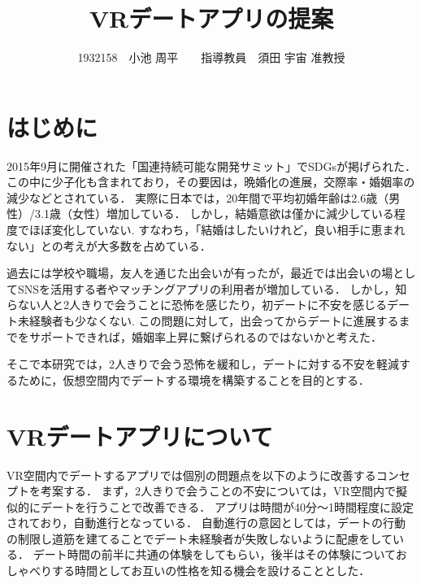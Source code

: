 \documentclass[twocolumn,10pt,a4j]{ltjsarticle}
\title{VRデートアプリの提案}
\author{1932158　小池 周平　　指導教員　須田 宇宙 准教授}
\date{ }
\begin{document}
\maketitle

\section{はじめに}


2015年9月に開催された「国連持続可能な開発サミット」でSDGsが掲げられた．この中に少子化も含まれており，その要因は，晩婚化の進展，交際率・婚姻率の減少\cite{naikakufu2019}などとされている．
実際に日本では，20年間で平均初婚年齢は2.6歳（男性）/3.1歳（女性）増加している．
しかし，結婚意欲は僅かに減少している程度でほぼ変化していない.
すなわち，「結婚はしたいけれど，良い相手に恵まれない」との考えが大多数を占めている\cite{naikakufu2019}．

過去には学校や職場，友人を通じた出会いが有ったが，最近では出会いの場としてSNSを活用する者やマッチングアプリの利用者が増加している．
しかし，知らない人と2人きりで会うことに恐怖を感じたり，初デートに不安を感じるデート未経験者も少なくない\cite{prtimes,yoshimura2020}.
この問題に対して，出会ってからデートに進展するまでをサポートできれば，婚姻率上昇に繋げられるのではないかと考えた．

そこで本研究では，2人きりで会う恐怖を緩和し，デートに対する不安を軽減するために，仮想空間内でデートする環境を構築することを目的とする．





\section{VRデートアプリについて}
VR空間内でデートするアプリでは個別の問題点を以下のように改善するコンセプトを考案する．
まず，2人きりで会うことの不安については，VR空間内で擬似的にデートを行うことで改善できる．
アプリは時間が40分〜1時間程度に設定されており，自動進行となっている．
自動進行の意図としては，デートの行動の制限し道筋を建てることでデート未経験者が失敗しないように配慮をしている．
デート時間の前半に共通の体験をしてもらい，後半はその体験についておしゃべりする時間としてお互いの性格を知る機会を設けることとした．
\end{document}
